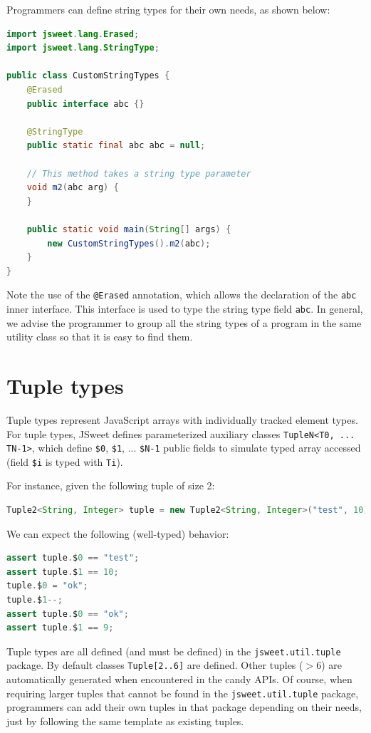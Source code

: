 \documentclass[a4paper]{report}
\begin{document}
Programmers can define string types for their own needs, as shown below:

\begin{lstlisting}[language=Java]
import jsweet.lang.Erased;
import jsweet.lang.StringType;

public class CustomStringTypes {
	@Erased
	public interface abc {}
	
	@StringType
	public static final abc abc = null;

	// This method takes a string type parameter
	void m2(abc arg) {
	}
	
	public static void main(String[] args) {
		new CustomStringTypes().m2(abc);
	}
}
\end{lstlisting}

Note the use of the \texttt{@Erased} annotation, which allows the declaration of the \texttt{abc} inner interface. This interface is used to type the string type field \texttt{abc}. In general, we advise the programmer to group all the string types of a program in the same utility class so that it is easy to find them.

\section{Tuple types}

Tuple types represent JavaScript arrays with individually tracked element types. For tuple types, JSweet defines parameterized auxiliary classes \texttt{TupleN<T0, ... TN-1>}, which define \texttt{\$0}, \texttt{\$1}, ... \texttt{\$N-1} public fields to simulate typed array accessed (field \texttt{\$i} is typed with \texttt{Ti}).

For instance, given the following tuple of size 2:

\begin{lstlisting}[language=Java]
Tuple2<String, Integer> tuple = new Tuple2<String, Integer>("test", 10);
\end{lstlisting}

We can expect the following (well-typed) behavior:

\begin{lstlisting}[language=Java]
assert tuple.$0 == "test";
assert tuple.$1 == 10;
tuple.$0 = "ok";
tuple.$1--;
assert tuple.$0 == "ok";
assert tuple.$1 == 9;
\end{lstlisting}

Tuple types are all defined (and must be defined) in the \texttt{jsweet.\-util.\-tuple} package. By default classes \texttt{Tuple[2..6]} are defined. Other tuples ($>6$) are automatically generated when encountered in the candy APIs. Of course, when requiring larger tuples that cannot be found in the \texttt{jsweet.\-util.\-tuple} package, programmers can add their own tuples in that package depending on their needs, just by following the same template as existing tuples.
\end{document}

